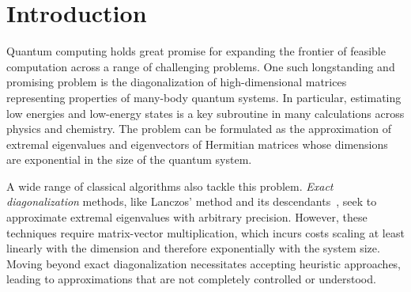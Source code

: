 \documentclass[
  reprint,            %
  amsmath,amssymb,
  aps,
  superscriptaddress, %
  longbibliography
]{revtex4-2}
\theoremstyle{definition}
\begin{document}
\begin{abstract}
    We experimentally demonstrate that a hybrid quantum-classical algorithm can outperform purely classical, off-the-shelf selected configuration interaction methods. First, we construct a class of local Hamiltonian problems with sparse ground states, and show that representative classical heuristics fail to find the ground state of a specific 49-qubit instance. Next, we show that the sample-based Krylov quantum diagonalization algorithm, run on an IBM Heron R3 processor, succeeds at the same task. This algorithm uses quantum samples from a grid of time-evolved quantum states, and offers provable convergence guarantees for sparse ground state problems with guiding states. 
    While the problem is also solvable classically using two iterative solvers that we designed specifically to target our Hamiltonian construction, this work resolves the previously open question of whether a sample-based quantum diagonalization algorithm can outperform standard selected configuration interaction heuristics.

    
    
    
\end{abstract}

\maketitle


\section{Introduction}
\label{sec:intro}

Quantum computing holds great promise for expanding the frontier of feasible computation across a range of challenging problems.
One such longstanding and promising problem is the diagonalization of high-dimensional matrices representing properties of many-body quantum systems.
In particular, estimating low energies and low-energy states is a key subroutine in many calculations across physics and chemistry. The problem can be formulated as the approximation of extremal eigenvalues and eigenvectors of Hermitian matrices whose dimensions are exponential in the size of the quantum system.

A wide range of classical algorithms also tackle this problem.
\emph{Exact diagonalization} methods, like Lanczos' method and its descendants~\cite{lanczos1950iteration,saad2011numerical}, seek to approximate extremal eigenvalues with arbitrary precision.
However, these techniques require matrix-vector multiplication, which incurs costs scaling at least linearly with the dimension and therefore exponentially with the system size.
Moving beyond exact diagonalization necessitates accepting heuristic approaches, leading to approximations that are not completely controlled or understood.
\end{document}
